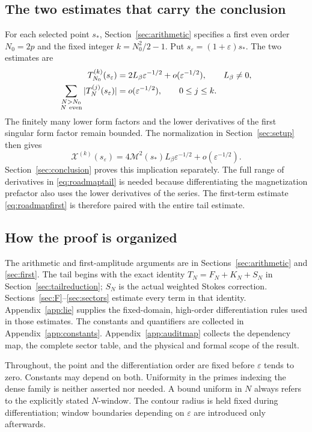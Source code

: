 \documentclass[11pt]{article}
\numberwithin{equation}{section}
\theoremstyle{definition}
\newcommand{\eps}{\varepsilon}
\newcommand{\M}{\mathcal M}
\begin{document}
\subsection{The two estimates that carry the conclusion}
For each selected point \(s_*\), Section~\ref{sec:arithmetic} specifies
a first even order \(N_0=2p\) and the fixed integer
\(k=N_0^2/2-1\). Put \(s_\eps=(1+\eps)s_*\). The two estimates are
\begin{align}
 T_{N_0}^{(k)}(s_\eps)
   &=2L_\beta\eps^{-1/2}+o(\eps^{-1/2}),\qquad L_\beta\ne0,
       \label{eq:roadmapfirst}\\
 \sum_{\substack{N>N_0\\N\ {\rm even}}}
       |T_N^{(j)}(s_\eps)|
   &=o(\eps^{-1/2}),\qquad 0\le j\le k .
       \label{eq:roadmaptail}
\end{align}
The finitely many lower form factors and the lower derivatives of the
first singular form factor remain bounded. The normalization in
Section~\ref{sec:setup} then gives
\[
 \mathcal X^{(k)}(s_\eps)
   =4\M^2(s_*)L_\beta\eps^{-1/2}+o(\eps^{-1/2}).
\]
Section~\ref{sec:conclusion} proves this implication separately.
The full range of derivatives in \eqref{eq:roadmaptail} is needed
because differentiating the magnetization prefactor also uses the
lower derivatives of the series. The first-term estimate
\eqref{eq:roadmapfirst} is therefore paired with the entire tail estimate.

\subsection{How the proof is organized}
The arithmetic and first-amplitude arguments are in
Sections~\ref{sec:arithmetic} and \ref{sec:first}. The tail begins
with the exact identity \(T_N=F_N+K_N+S_N\) in
Section~\ref{sec:tailreduction}; \(S_N\) is the actual weighted
Stokes correction. Sections~\ref{sec:F}--\ref{sec:sectors} estimate
every term in that identity. Appendix~\ref{app:lie} supplies the
fixed-domain, high-order differentiation rules used in those estimates.
The constants and quantifiers are collected in
Appendix~\ref{app:constants}. Appendix~\ref{app:auditmap} collects
the dependency map, the complete sector table, and the physical and
formal scope of the result.

Throughout, the point and the differentiation order are fixed before
\(\eps\) tends to zero. Constants may depend on both. Uniformity in
the primes indexing the dense family is neither asserted nor needed.
A bound uniform in \(N\) always refers to the explicitly stated
\(N\)-window. The contour radius is held fixed during differentiation;
window boundaries depending on \(\eps\) are introduced only afterwards.
\end{document}
